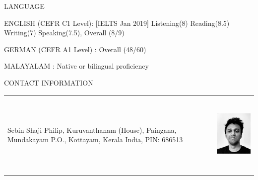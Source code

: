 \documentclass[
	a4paper, %
	11pt, %
]{resume} %
\begin{document}


\begin{rSection}{LANGUAGE}
    \item {ENGLISH (CEFR C1 Level): } [IELTS Jan 2019] Listening(8) Reading(8.5) Writing(7) Speaking(7.5), Overall (8/9)
    \item {GERMAN (CEFR A1 Level) : }  Overall (48/60) 
    \item {MALAYALAM              : } Native or bilingual proficiency
\end{rSection}



\begin{rSection}{CONTACT INFORMATION}
    \centering 
        \begin{tabular}[t]{m{3.5cm} m{14cm}}
        Sebin Shaji Philip,
        Kuruvanthanam (House),
        Paingana,
        Mundakayam P.O.,
        Kottayam, Kerala
        India,
        PIN: 686513 & \includegraphics[width=3.5cm, height=4cm]{dp}
        \end{tabular}
        
        
    \end{rSection}
    
    
\end{document}

